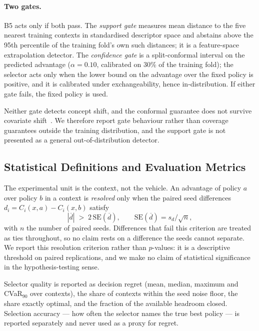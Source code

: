 \documentclass[runningheads]{llncs}
\begin{document}
\paragraph{Two gates.} B5 acts only if both pass. The \emph{support gate}
measures mean distance to the five nearest training contexts in standardised
descriptor space and abstains above the 95th percentile of the training fold's
own such distances; it is a feature-space extrapolation detector. The
\emph{confidence gate} is a split-conformal interval on the predicted advantage
($\alpha=0.10$, calibrated on 30\% of the training fold); the selector acts only
when the lower bound on the advantage over the fixed policy is positive, and it
is calibrated under exchangeability, hence in-distribution. If either gate
fails, the fixed policy is used.

Neither gate detects concept shift, and the conformal guarantee does not survive
covariate shift~\cite{shimodaira2000,tibshirani2019covshift}. We therefore
report gate behaviour rather than coverage guarantees outside the training
distribution, and the support gate is not presented as a general
out-of-distribution detector.

\subsection{Statistical Definitions and Evaluation Metrics}
\label{sec:stats}

The experimental unit is the context, not the vehicle. An advantage of policy
$a$ over policy $b$ in a context is \emph{resolved} only when the paired seed
differences $d_i = C_i(x,a) - C_i(x,b)$ satisfy
\begin{equation}
|\overline{d}| \;>\; 2\,\mathrm{SE}(\overline{d}),
\qquad
\mathrm{SE}(\overline{d}) = s_d / \sqrt{n},
\label{eq:resolved}
\end{equation}
with $n$ the number of paired seeds. Differences that fail this criterion are
treated as ties throughout, so no claim rests on a difference the seeds cannot
separate. We report this resolution criterion rather than $p$-values: it is a
descriptive threshold on paired replications, and we make no claim of
statistical significance in the hypothesis-testing sense.

Selector quality is reported as decision regret (mean, median, maximum and
CVaR$_{90}$ over contexts), the share of contexts within the seed noise floor,
the share exactly optimal, and the fraction of the available headroom closed.
Selection accuracy --- how often the selector names the true best policy --- is
reported separately and never used as a proxy for regret.
\end{document}
